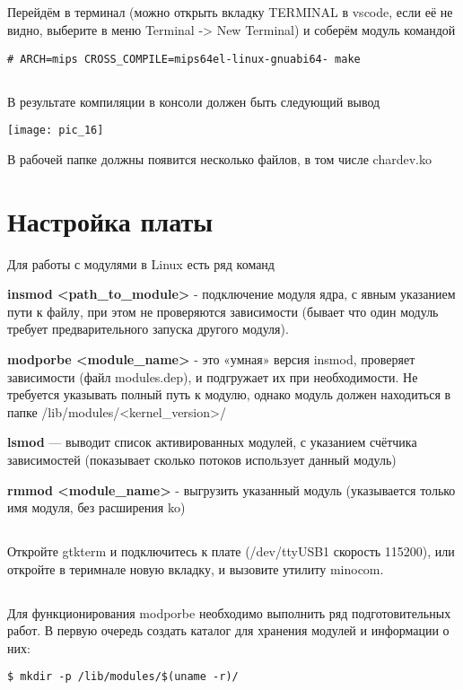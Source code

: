 \subsection{}Перейдём в терминал (можно открыть вкладку TERMINAL в vscode, если её не видно, выберите в меню Terminal -> New Terminal) и соберём модуль командой
\begin{lstlisting}[style=bash]
# ARCH=mips CROSS_COMPILE=mips64el-linux-gnuabi64- make
\end{lstlisting}

\subsection{}В результате компиляции в консоли должен быть следующий вывод
\begin{center}
	\texttt{[image: pic\_16]}
\end{center}
В рабочей папке должны появится несколько файлов, в том числе chardev.ko

\section{Настройка платы}
Для работы с модулями в Linux есть ряд команд

\textbf{insmod <path\_to\_module>} - подключение модуля ядра, с явным указанием пути к файлу, при этом не проверяются зависимости (бывает что один модуль требует предварительного запуска другого модуля).

\textbf{modporbe <module\_name>} - это «умная» версия insmod, проверяет зависимости (файл modules.dep), и подгружает их при необходимости. Не требуется указывать полный путь к модулю, однако модуль должен находиться в папке  /lib/modules/<kernel\_version>/

\textbf{lsmod} — выводит список активированных модулей, с указанием счётчика зависимостей (показывает сколько потоков использует данный модуль)

\textbf{rmmod <module\_name>} - выгрузить указанный модуль (указывается только имя модуля, без расширения ko)

\subsection{}Откройте gtkterm и подключитесь к плате (/dev/ttyUSB1 скорость 115200), или откройте в теримнале новую вкладку, и вызовите утилиту minocom.

\subsection{}Для функционирования modporbe необходимо выполнить ряд подготовительных работ. В первую очередь создать каталог для хранения модулей и информации о них:
\begin{lstlisting}[style=bash]
$ mkdir -p /lib/modules/$(uname -r)/
\end{lstlisting}

